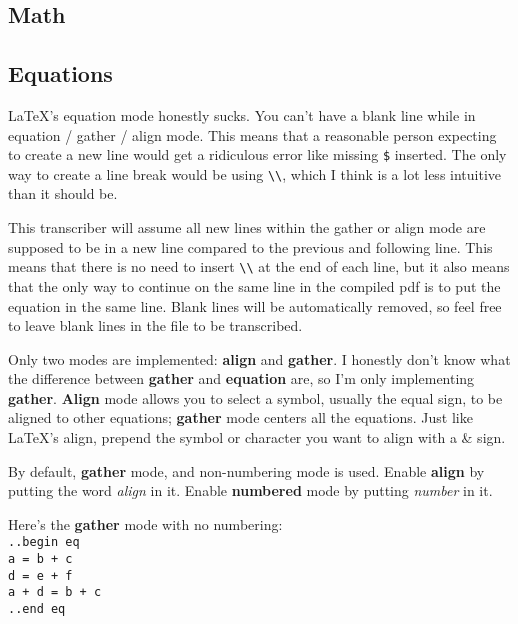 \documentclass[12pt]{article}
\newcommand{\ital}{\emph}
\newcommand{\nl}{\\}
\renewcommand\bold{\textbf}
\numberwithin{equation}{section}
\begin{document}
\begin{flushleft}
\newpage

\section{Math}

\subsection*{Equations}

LaTeX's equation mode honestly sucks. You can't have a blank line while in equation / gather / align mode. This means that a reasonable person expecting to create a new line would get a ridiculous error like missing \verb|$| inserted. The only way to create a line break would be using \verb|\\|, which I think is a lot less intuitive than it should be.

\medskip

This transcriber will assume all new lines within the gather or align mode are supposed to be in a new line compared to the previous and following line. This means that there is no need to insert \verb|\\| at the end of each line, but it also means that the only way to continue on the same line in the compiled pdf is to put the equation in the same line. Blank lines will be automatically removed, so feel free to leave blank lines in the file to be transcribed.

\medskip

Only two modes are implemented: \bold{align} and \bold{gather}. I honestly don't know what the difference between \bold{gather} and \bold{equation} are, so I'm only implementing \bold{gather}. \bold{Align} mode allows you to select a symbol, usually the equal sign, to be aligned to other equations; \bold{gather} mode centers all the equations. Just like LaTeX's align, prepend the symbol or character you want to align with a \& sign.

\medskip

By default, \bold{gather} mode, and non-numbering mode is used. Enable \bold{align} by putting the word \ital{align} in it. Enable \bold{numbered} mode by putting \ital{number} in it.

\medskip

\medskip

Here's the \bold{gather} mode with no numbering: \nl
\verb|..begin eq|\nl
\verb|a = b + c|\nl
\verb|d = e + f|\nl
\verb|a + d = b + c|\nl
\verb|..end eq|


\end{flushleft}
\end{document}
